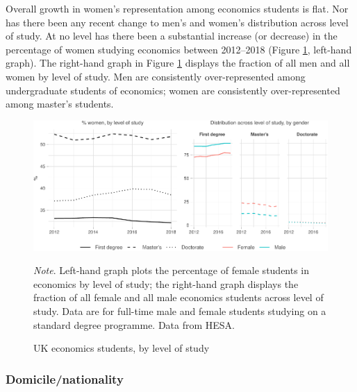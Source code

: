 \documentclass[a4paper, 1]{article}
\begin{document}
Overall growth in women's representation among economics students is flat. Nor has there been any recent change to men's and women's distribution across level of study. At no level has there been a substantial increase (or decrease) in the percentage of women studying economics between 2012--2018 (Figure \ref{fig:level}, left-hand graph). The right-hand graph in Figure \ref{fig:level} displays the fraction of all men and all women by level of study. Men are consistently over-represented among undergraduate students of economics; women are consistently over-represented among master's students.



\begin{figure}
\centering
\includegraphics[width=\linewidth]{0-images/level-1.pdf}

\caption{UK economics students, by level of study}
\label{fig:level}
\justify\footnotesize\textit{Note}.  Left-hand graph plots the percentage of female students in economics by level of study; the right-hand graph displays the fraction of all female and all male economics students across level of study. Data are for full-time male and female students studying on a standard degree programme. Data from HESA.
\end{figure}



\hypertarget{domicilenationality}{%
\subsubsection{Domicile/nationality}\label{domicilenationality}}
\end{document}
